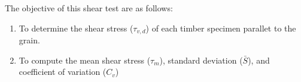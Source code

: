 \noindent The objective of this shear test are as follows:
\begin{enumerate}
    \item To determine the shear stress ($\tau_{v,d}$) of each timber specimen parallet to the grain.
    \item To compute the mean shear stress ($\tau_m$), standard deviation ($\bar{S}$), and coefficient of variation ($C_v$)
\end{enumerate}